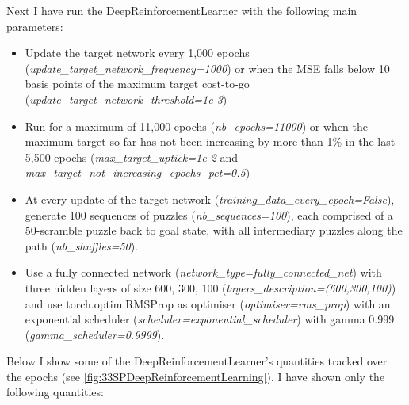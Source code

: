 \label{sec:S33DRL}
Next I have run the DeepReinforcementLearner with the following main parameters:
\begin{itemize}
\item Update the target network every 1,000 epochs (\textit{update\_target\_network\_frequency=1000}) or when the MSE falls below 10 basis points of the maximum target cost-to-go (\textit{update\_target\_network\_threshold=1e-3})
\item Run for a maximum of 11,000 epochs (\textit{nb\_epochs=11000}) or when the maximum target so far has not been increasing by more than 1\% in the last 5,500 epochs (\textit{max\_target\_uptick=1e-2} and \textit{max\_target\_not\_increasing\_epochs\_pct=0.5})
\item At every update of the target network (\textit{training\_data\_every\_epoch=False}), generate 100 sequences of puzzles (\textit{nb\_sequences=100}), each comprised of a 50-scramble puzzle back to goal state, with all intermediary puzzles along the path (\textit{nb\_shuffles=50}).
\item Use a fully connected network (\textit{network\_type=fully\_connected\_net}) with three hidden layers of size 600, 300, 100 (\textit{layers\_description=(600,300,100)}) and use torch.optim.RMSProp as optimiser (\textit{optimiser=rms\_prop}) with an exponential scheduler (\textit{scheduler=exponential\_scheduler}) with gamma 0.999 (\textit{gamma\_scheduler=0.9999}).
\end{itemize}
Below I show some of the DeepReinforcementLearner's quantities tracked over the epochs (see \ref{fig:33SPDeepReinforcementLearning}). I have shown only the following quantities:
